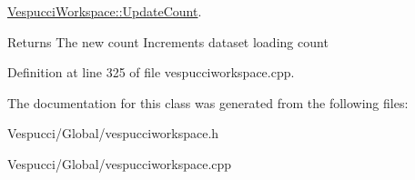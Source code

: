 \hyperlink{class_vespucci_workspace_aebfe908b3f6d609aa1d9ecb3559b78cb}{Vespucci\+Workspace\+::\+Update\+Count}. 

\begin{DoxyReturn}{Returns}
The new count Increments dataset loading count 
\end{DoxyReturn}


Definition at line 325 of file vespucciworkspace.\+cpp.



The documentation for this class was generated from the following files\+:\begin{DoxyCompactItemize}
\item 
Vespucci/\+Global/vespucciworkspace.\+h\item 
Vespucci/\+Global/vespucciworkspace.\+cpp\end{DoxyCompactItemize}
